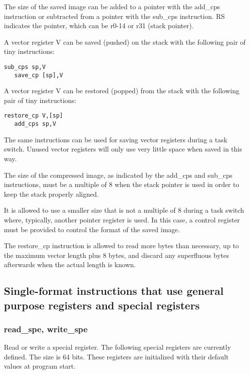 \documentclass[forwardcom.tex]{subfiles}
\begin{document}
The size of the saved image can be added to a pointer with the add\_cps instruction or subtracted from a pointer with the sub\_cps instruction. RS indicates the pointer, which can be r0-14 or r31 (stack pointer).
\vspace{2mm}

A vector register V can be saved (pushed) on the stack with the following pair of tiny instructions:

\begin{lstlisting}[frame=none]
   sub_cps sp,V
   save_cp [sp],V
\end{lstlisting}

A vector register V can be restored (popped) from the stack with the following pair of tiny instructions:

\begin{lstlisting}[frame=none]
   restore_cp V,[sp]
   add_cps sp,V
\end{lstlisting}

The same instructions can be used for saving vector registers during a task switch. Unused vector registers will only use very little space when saved in this way.
\vspace{2mm}

The size of the compressed image, as indicated by the add\_cps and sub\_cps instructions, must be a multiple of 8 when the stack pointer is used in order to keep the stack properly aligned. 
\vspace{2mm}

It is allowed to use a smaller size that is not a multiple of 8 during a task switch where, typically, another pointer register is used. In this case, a control register must be provided to control the format of the saved image.
\vspace{2mm}

The restore\_cp instruction is allowed to read more bytes than necessary, up to the maximum vector length plus 8 bytes, and discard any superfluous bytes afterwards when the actual length is known.

\subsection{Single-format instructions that use general purpose registers and special registers}

\subsubsection{read\_spe, write\_spe}
Read or write a special register. The following special registers are currently defined. The size is 64 bits. These registers are initialized with their default values at program start.
\end{document}
